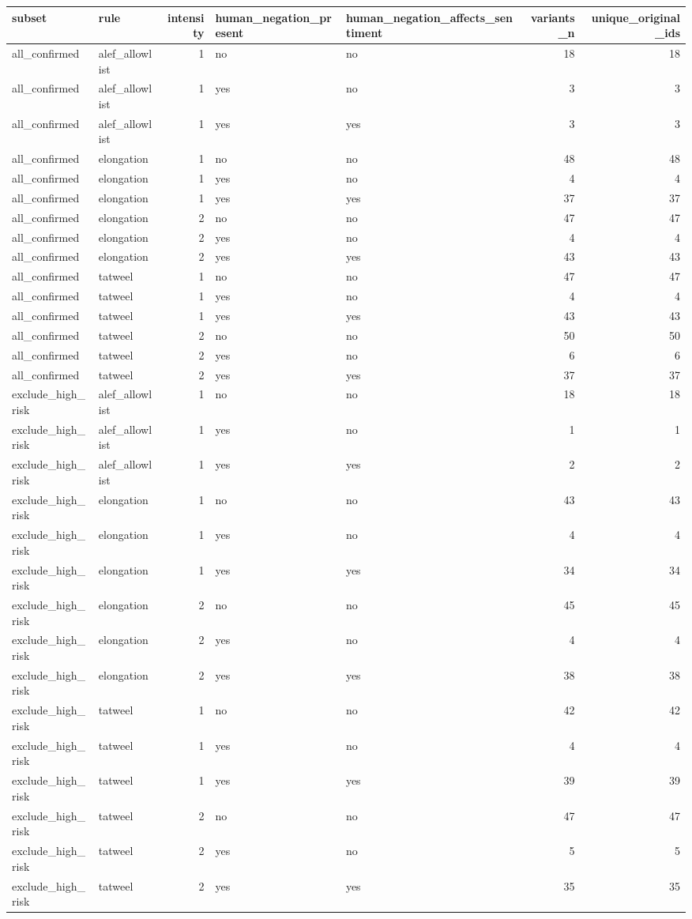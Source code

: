 \begin{tabular}{llrllrr}
\toprule
subset & rule & intensity & human_negation_present & human_negation_affects_sentiment & variants_n & unique_original_ids \\
\midrule
all_confirmed & alef_allowlist & 1 & no & no & 18 & 18 \\
all_confirmed & alef_allowlist & 1 & yes & no & 3 & 3 \\
all_confirmed & alef_allowlist & 1 & yes & yes & 3 & 3 \\
all_confirmed & elongation & 1 & no & no & 48 & 48 \\
all_confirmed & elongation & 1 & yes & no & 4 & 4 \\
all_confirmed & elongation & 1 & yes & yes & 37 & 37 \\
all_confirmed & elongation & 2 & no & no & 47 & 47 \\
all_confirmed & elongation & 2 & yes & no & 4 & 4 \\
all_confirmed & elongation & 2 & yes & yes & 43 & 43 \\
all_confirmed & tatweel & 1 & no & no & 47 & 47 \\
all_confirmed & tatweel & 1 & yes & no & 4 & 4 \\
all_confirmed & tatweel & 1 & yes & yes & 43 & 43 \\
all_confirmed & tatweel & 2 & no & no & 50 & 50 \\
all_confirmed & tatweel & 2 & yes & no & 6 & 6 \\
all_confirmed & tatweel & 2 & yes & yes & 37 & 37 \\
exclude_high_risk & alef_allowlist & 1 & no & no & 18 & 18 \\
exclude_high_risk & alef_allowlist & 1 & yes & no & 1 & 1 \\
exclude_high_risk & alef_allowlist & 1 & yes & yes & 2 & 2 \\
exclude_high_risk & elongation & 1 & no & no & 43 & 43 \\
exclude_high_risk & elongation & 1 & yes & no & 4 & 4 \\
exclude_high_risk & elongation & 1 & yes & yes & 34 & 34 \\
exclude_high_risk & elongation & 2 & no & no & 45 & 45 \\
exclude_high_risk & elongation & 2 & yes & no & 4 & 4 \\
exclude_high_risk & elongation & 2 & yes & yes & 38 & 38 \\
exclude_high_risk & tatweel & 1 & no & no & 42 & 42 \\
exclude_high_risk & tatweel & 1 & yes & no & 4 & 4 \\
exclude_high_risk & tatweel & 1 & yes & yes & 39 & 39 \\
exclude_high_risk & tatweel & 2 & no & no & 47 & 47 \\
exclude_high_risk & tatweel & 2 & yes & no & 5 & 5 \\
exclude_high_risk & tatweel & 2 & yes & yes & 35 & 35 \\
\bottomrule
\end{tabular}
